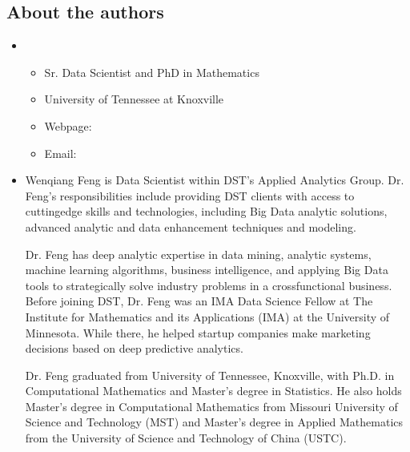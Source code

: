 \documentclass[letterpaper,11pt,english]{sphinxmanual}
\begin{document}
\subsection{About the authors}
\label{\detokenize{preface:about-the-authors}}\begin{itemize}
\item {} 
\sphinxAtStartPar
{}
\begin{itemize}
\item {} 
\sphinxAtStartPar
Sr. Data Scientist and PhD in Mathematics

\item {} 
\sphinxAtStartPar
University of Tennessee at Knoxville

\item {} 
\sphinxAtStartPar
Webpage: 

\item {} 
\sphinxAtStartPar
Email: 

\end{itemize}

\item {} 
\sphinxAtStartPar
{}

\sphinxAtStartPar
Wenqiang Feng is Data Scientist within DST’s Applied Analytics Group. Dr. Feng’s responsibilities include providing
DST clients with access to cutting\sphinxhyphen{}edge skills and technologies, including Big Data analytic solutions, advanced
analytic and data enhancement techniques and modeling.

\sphinxAtStartPar
Dr. Feng has deep analytic expertise in data mining, analytic systems, machine learning algorithms, business
intelligence, and applying Big Data tools to strategically solve industry problems in a cross\sphinxhyphen{}functional business.
Before joining DST, Dr. Feng was an IMA Data Science Fellow at The Institute for Mathematics and its
Applications (IMA) at the University of Minnesota. While there, he helped startup companies make marketing
decisions based on deep predictive analytics.

\sphinxAtStartPar
Dr. Feng graduated from University of Tennessee, Knoxville, with Ph.D. in Computational Mathematics and Master’s
degree in Statistics. He also holds Master’s degree in Computational Mathematics from Missouri University of
Science and Technology (MST) and Master’s degree in Applied Mathematics from the University of Science and
Technology of China (USTC).


\end{itemize}
\end{document}
